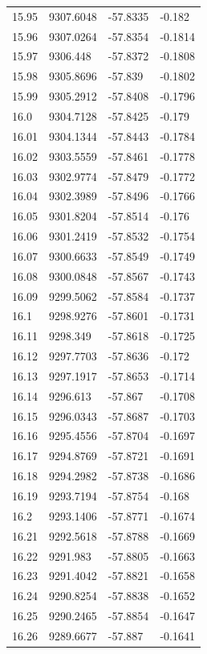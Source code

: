 \begin{table}[H]
\begin{tabular}{llll}
15.95 & 9307.6048 & -57.8335 & -0.182 \\
15.96 & 9307.0264 & -57.8354 & -0.1814 \\
15.97 & 9306.448 & -57.8372 & -0.1808 \\
15.98 & 9305.8696 & -57.839 & -0.1802 \\
15.99 & 9305.2912 & -57.8408 & -0.1796 \\
16.0 & 9304.7128 & -57.8425 & -0.179 \\
16.01 & 9304.1344 & -57.8443 & -0.1784 \\
16.02 & 9303.5559 & -57.8461 & -0.1778 \\
16.03 & 9302.9774 & -57.8479 & -0.1772 \\
16.04 & 9302.3989 & -57.8496 & -0.1766 \\
16.05 & 9301.8204 & -57.8514 & -0.176 \\
16.06 & 9301.2419 & -57.8532 & -0.1754 \\
16.07 & 9300.6633 & -57.8549 & -0.1749 \\
16.08 & 9300.0848 & -57.8567 & -0.1743 \\
16.09 & 9299.5062 & -57.8584 & -0.1737 \\
16.1 & 9298.9276 & -57.8601 & -0.1731 \\
16.11 & 9298.349 & -57.8618 & -0.1725 \\
16.12 & 9297.7703 & -57.8636 & -0.172 \\
16.13 & 9297.1917 & -57.8653 & -0.1714 \\
16.14 & 9296.613 & -57.867 & -0.1708 \\
16.15 & 9296.0343 & -57.8687 & -0.1703 \\
16.16 & 9295.4556 & -57.8704 & -0.1697 \\
16.17 & 9294.8769 & -57.8721 & -0.1691 \\
16.18 & 9294.2982 & -57.8738 & -0.1686 \\
16.19 & 9293.7194 & -57.8754 & -0.168 \\
16.2 & 9293.1406 & -57.8771 & -0.1674 \\
16.21 & 9292.5618 & -57.8788 & -0.1669 \\
16.22 & 9291.983 & -57.8805 & -0.1663 \\
16.23 & 9291.4042 & -57.8821 & -0.1658 \\
16.24 & 9290.8254 & -57.8838 & -0.1652 \\
16.25 & 9290.2465 & -57.8854 & -0.1647 \\
16.26 & 9289.6677 & -57.887 & -0.1641 \\

\end{tabular}
\end{table}

